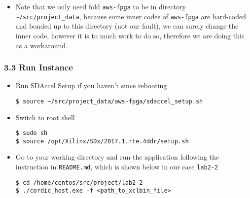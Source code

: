 \documentclass[]{article}
\begin{document}
\begin{itemize}
\item
  Note that we only need fold \texttt{aws-fpga} to be in directory
  \texttt{\textasciitilde{}/src/project\_data}, because some inner codes
  of \texttt{aws-fpga} are hard-coded and bonded up to this directory
  (not our fault), we can surely change the inner code, however it is to
  much work to do so, therefore we are doing this as a workaround.
\end{itemize}

\hypertarget{header-n486}{%
\subsubsection{3.3 Run Instance}\label{header-n486}}

\begin{itemize}
\item
  Run SDAccel Setup if you haven't since rebooting

\begin{verbatim}
$ source ~/src/project_data/aws-fpga/sdaccel_setup.sh
\end{verbatim}
\item
  Switch to root shell

\begin{verbatim}
$ sudo sh
$ source /opt/Xilinx/SDx/2017.1.rte.4ddr/setup.sh
\end{verbatim}
\item
  Go to your working directory and run the application following the
  instruction in \texttt{README.md}, which is shown below in our case
  \texttt{lab2-2}

\begin{verbatim}
$ cd /home/centos/src/project/lab2-2
$ ./cordic_host.exe -f <path_to_xclbin_file>
\end{verbatim}
\end{itemize}
\end{document}
